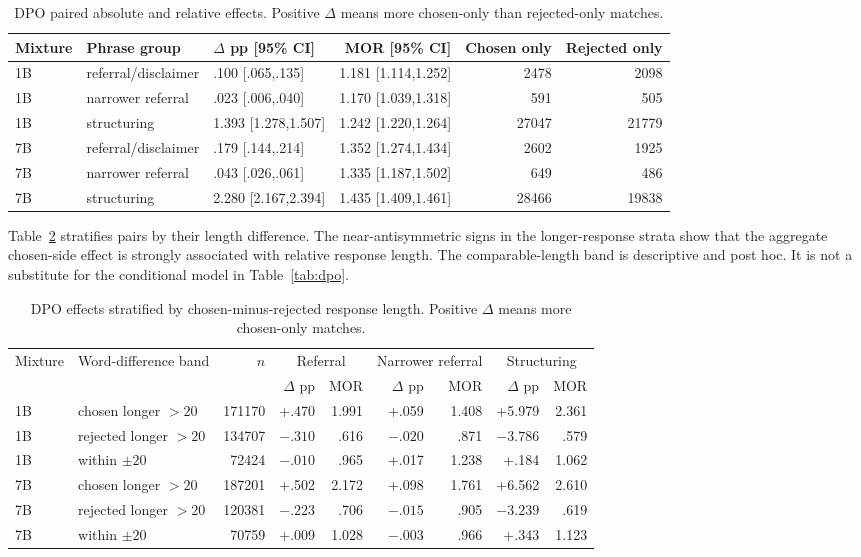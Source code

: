 \documentclass[11pt]{article}
\begin{document}
\begin{table}[h]
\centering
\small
\setlength{\tabcolsep}{4pt}
\begin{tabular}{lllrrr}
\toprule
Mixture & Phrase group & $\Delta$ pp [95\% CI] & MOR [95\% CI] & Chosen only & Rejected only \\
\midrule
1B & referral/disclaimer & .100 [.065,.135] & 1.181 [1.114,1.252] & 2478 & 2098 \\
1B & narrower referral & .023 [.006,.040] & 1.170 [1.039,1.318] & 591 & 505 \\
1B & structuring & 1.393 [1.278,1.507] & 1.242 [1.220,1.264] & 27047 & 21779 \\
\midrule
7B & referral/disclaimer & .179 [.144,.214] & 1.352 [1.274,1.434] & 2602 & 1925 \\
7B & narrower referral & .043 [.026,.061] & 1.335 [1.187,1.502] & 649 & 486 \\
7B & structuring & 2.280 [2.167,2.394] & 1.435 [1.409,1.461] & 28466 & 19838 \\
\bottomrule
\end{tabular}
\caption{DPO paired absolute and relative effects. Positive $\Delta$ means more
chosen-only than rejected-only matches.}
\label{tab:dpo-intervals}
\end{table}

Table~\ref{tab:dpo-length} stratifies pairs by their length difference. The
near-antisymmetric signs in the longer-response strata show that the aggregate
chosen-side effect is strongly associated with relative response length. The
comparable-length band is descriptive and post hoc. It is not a substitute for
the conditional model in Table~\ref{tab:dpo}.

\begin{table}[h]
\centering
\footnotesize
\setlength{\tabcolsep}{3pt}
\begin{tabular}{llrrrrrrr}
\toprule
Mixture & Word-difference band & $n$ & \multicolumn{2}{c}{Referral} &
\multicolumn{2}{c}{Narrower referral} & \multicolumn{2}{c}{Structuring} \\
 & & & $\Delta$ pp & MOR & $\Delta$ pp & MOR & $\Delta$ pp & MOR \\
\midrule
1B & chosen longer $>20$ & 171170 & +.470 & 1.991 & +.059 & 1.408 & +5.979 & 2.361 \\
1B & rejected longer $>20$ & 134707 & $-.310$ & .616 & $-.020$ & .871 & $-3.786$ & .579 \\
1B & within $\pm20$ & 72424 & $-.010$ & .965 & +.017 & 1.238 & +.184 & 1.062 \\
\midrule
7B & chosen longer $>20$ & 187201 & +.502 & 2.172 & +.098 & 1.761 & +6.562 & 2.610 \\
7B & rejected longer $>20$ & 120381 & $-.223$ & .706 & $-.015$ & .905 & $-3.239$ & .619 \\
7B & within $\pm20$ & 70759 & +.009 & 1.028 & $-.003$ & .966 & +.343 & 1.123 \\
\bottomrule
\end{tabular}
\caption{DPO effects stratified by chosen-minus-rejected response length.
Positive $\Delta$ means more chosen-only matches.}
\label{tab:dpo-length}
\end{table}
\end{document}
